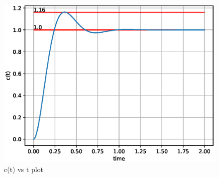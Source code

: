 \begin{enumerate}[label=\thesubsection.\arabic*.,ref=\thesubsection.\theenumi]
\begin{figure}[!h]
    \centering
    \includegraphics[width=\columnwidth]{figs/ee18btech11045/ee18btech11045.eps}
    \caption{c(t) vs t plot}
    \label{fig:ee18btech11045_fig1}
\end{figure}

\end{enumerate}